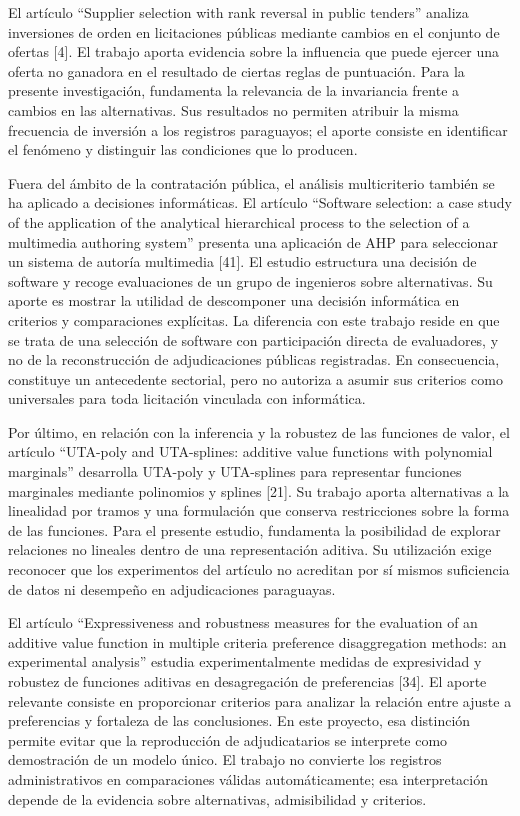 \documentclass[12pt,a4paper]{article}
\begin{document}
El artículo ``Supplier selection with rank reversal in public tenders'' analiza inversiones de orden en licitaciones públicas mediante cambios en el conjunto de ofertas [4]. El trabajo aporta evidencia sobre la influencia que puede ejercer una oferta no ganadora en el resultado de ciertas reglas de puntuación. Para la presente investigación, fundamenta la relevancia de la invariancia frente a cambios en las alternativas. Sus resultados no permiten atribuir la misma frecuencia de inversión a los registros paraguayos; el aporte consiste en identificar el fenómeno y distinguir las condiciones que lo producen.

Fuera del ámbito de la contratación pública, el análisis multicriterio también se ha aplicado a decisiones informáticas. El artículo ``Software selection: a case study of the application of the analytical hierarchical process to the selection of a multimedia authoring system'' presenta una aplicación de AHP para seleccionar un sistema de autoría multimedia [41]. El estudio estructura una decisión de software y recoge evaluaciones de un grupo de ingenieros sobre alternativas. Su aporte es mostrar la utilidad de descomponer una decisión informática en criterios y comparaciones explícitas. La diferencia con este trabajo reside en que se trata de una selección de software con participación directa de evaluadores, y no de la reconstrucción de adjudicaciones públicas registradas. En consecuencia, constituye un antecedente sectorial, pero no autoriza a asumir sus criterios como universales para toda licitación vinculada con informática.

Por último, en relación con la inferencia y la robustez de las funciones de valor, el artículo ``UTA-poly and UTA-splines: additive value functions with polynomial marginals'' desarrolla UTA-poly y UTA-splines para representar funciones marginales mediante polinomios y splines [21]. Su trabajo aporta alternativas a la linealidad por tramos y una formulación que conserva restricciones sobre la forma de las funciones. Para el presente estudio, fundamenta la posibilidad de explorar relaciones no lineales dentro de una representación aditiva. Su utilización exige reconocer que los experimentos del artículo no acreditan por sí mismos suficiencia de datos ni desempeño en adjudicaciones paraguayas.

El artículo ``Expressiveness and robustness measures for the evaluation of an additive value function in multiple criteria preference disaggregation methods: an experimental analysis'' estudia experimentalmente medidas de expresividad y robustez de funciones aditivas en desagregación de preferencias [34]. El aporte relevante consiste en proporcionar criterios para analizar la relación entre ajuste a preferencias y fortaleza de las conclusiones. En este proyecto, esa distinción permite evitar que la reproducción de adjudicatarios se interprete como demostración de un modelo único. El trabajo no convierte los registros administrativos en comparaciones válidas automáticamente; esa interpretación depende de la evidencia sobre alternativas, admisibilidad y criterios.
\end{document}
